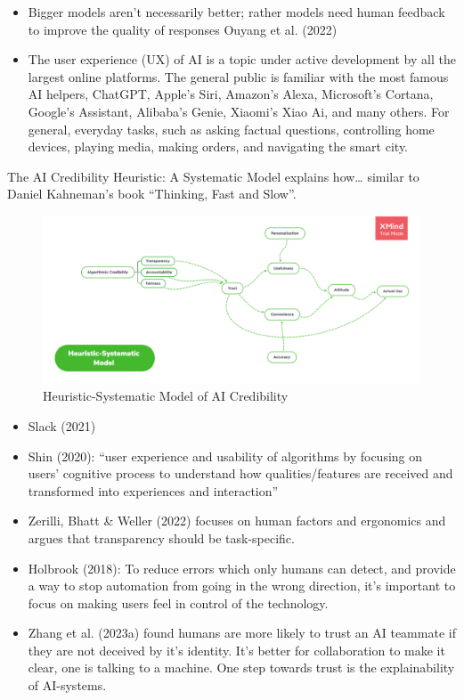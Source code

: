\documentclass[
  letterpaper,
  DIV=11,
  numbers=noendperiod]{scrartcl}
\begin{document}
\begin{itemize}
\item
  Bigger models aren't necessarily better; rather models need human
  feedback to improve the quality of responses Ouyang et al. (2022)
\item
  The user experience (UX) of AI is a topic under active development by
  all the largest online platforms. The general public is familiar with
  the most famous AI helpers, ChatGPT, Apple's Siri, Amazon's Alexa,
  Microsoft's Cortana, Google's Assistant, Alibaba's Genie, Xiaomi's
  Xiao Ai, and many others. For general, everyday tasks, such as asking
  factual questions, controlling home devices, playing media, making
  orders, and navigating the smart city.
\end{itemize}

The AI Credibility Heuristic: A Systematic Model explains how\ldots{}
similar to Daniel Kahneman's book ``Thinking, Fast and Slow''.

\begin{figure}[H]

{\centering \includegraphics[width=1\textwidth,height=\textheight]{./images/ai/ai-credibility.png}

}

\caption{Heuristic-Systematic Model of AI Credibility}

\end{figure}%

\begin{itemize}
\item
  Slack (2021)
\item
  Shin (2020): ``user experience and usability of algorithms by focusing
  on users' cognitive process to understand how qualities/features are
  received and transformed into experiences and interaction''
\item
  Zerilli, Bhatt \& Weller (2022) focuses on human factors and
  ergonomics and argues that transparency should be task-specific.
\item
  Holbrook (2018): To reduce errors which only humans can detect, and
  provide a way to stop automation from going in the wrong direction,
  it's important to focus on making users feel in control of the
  technology.
\item
  Zhang et al. (2023a) found humans are more likely to trust an AI
  teammate if they are not deceived by it's identity. It's better for
  collaboration to make it clear, one is talking to a machine. One step
  towards trust is the explainability of AI-systems.
\end{itemize}
\end{document}

